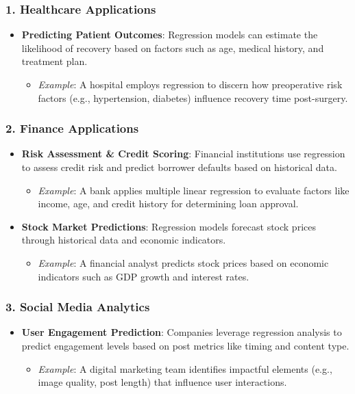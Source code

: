 \documentclass[aspectratio=169]{beamer}
\begin{document}
\begin{frame}[fragile]
  \frametitle{1. Healthcare Applications}
  \begin{itemize}
    \item \textbf{Predicting Patient Outcomes}: 
      Regression models can estimate the likelihood of recovery based on factors such as age, medical history, and treatment plan.
      \begin{itemize}
        \item \textit{Example}: A hospital employs regression to discern how preoperative risk factors (e.g., hypertension, diabetes) influence recovery time post-surgery.
      \end{itemize}
  \end{itemize}
\end{frame}

\begin{frame}[fragile]
  \frametitle{2. Finance Applications}
  \begin{itemize}
    \item \textbf{Risk Assessment \& Credit Scoring}:
      Financial institutions use regression to assess credit risk and predict borrower defaults based on historical data.
      \begin{itemize}
        \item \textit{Example}: A bank applies multiple linear regression to evaluate factors like income, age, and credit history for determining loan approval.
      \end{itemize}
    \item \textbf{Stock Market Predictions}:
      Regression models forecast stock prices through historical data and economic indicators.
      \begin{itemize}
        \item \textit{Example}: A financial analyst predicts stock prices based on economic indicators such as GDP growth and interest rates.
      \end{itemize}
  \end{itemize}
\end{frame}

\begin{frame}[fragile]
  \frametitle{3. Social Media Analytics}
  \begin{itemize}
    \item \textbf{User Engagement Prediction}:
      Companies leverage regression analysis to predict engagement levels based on post metrics like timing and content type.
      \begin{itemize}
        \item \textit{Example}: A digital marketing team identifies impactful elements (e.g., image quality, post length) that influence user interactions.
      \end{itemize}
  \end{itemize}
\end{frame}
\end{document}
